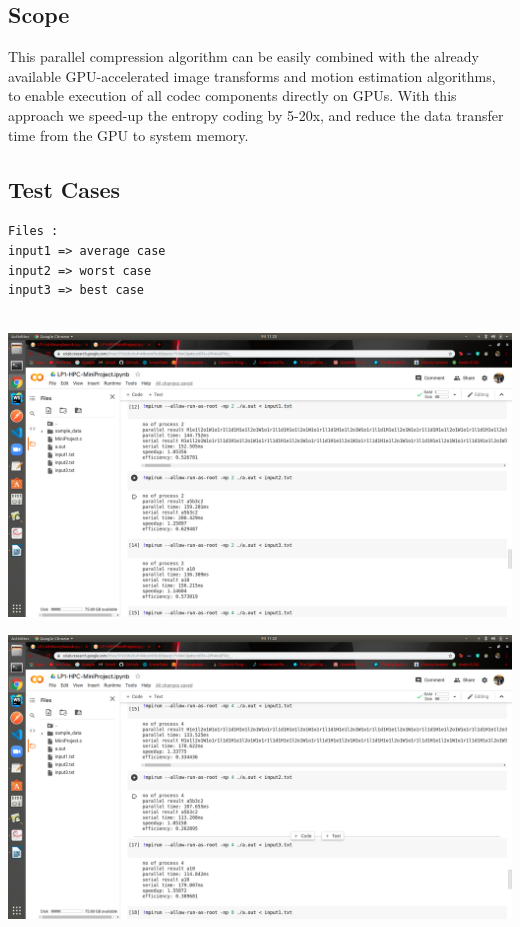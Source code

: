 \documentclass[a4paper, 12pt]{article}
\begin{document}
\newpage
\begin{center}
\section{Scope}
\end{center}

This parallel compression algorithm can be easily combined with the already available GPU-accelerated
image transforms and motion estimation algorithms, to enable execution of all codec components directly
on GPUs. With this approach we speed-up the entropy coding by 5-20x, and reduce the data transfer time
from the GPU to system memory.
\newpage
\begin{center}
\section{Test Cases}
\end{center}
\begin{verbatim}
Files :
input1 => average case
input2 => worst case
input3 => best case
    
\end{verbatim}
\begin{center}
    \includegraphics[width=\linewidth]{2_.png}
\end{center}
\par
\begin{center}
    \includegraphics[width=\linewidth]{4_.png}
\end{center}
\end{document}
